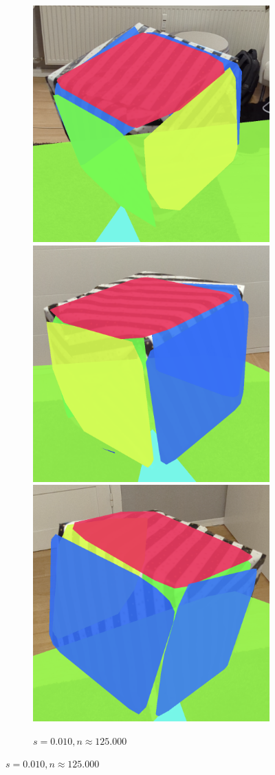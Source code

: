 \begin{figure}[h!tbp]
    \begin{subfigure}[b]{\textwidth}
        \centering
        \includegraphics[width=0.3\linewidth]{images/cube_010_1}
        \includegraphics[width=0.3\linewidth]{images/cube_010_2}
        \includegraphics[width=0.3\linewidth]{images/cube_010_3}
        \caption{$s=0.010, n\approx125.000$}
    \end{subfigure}%

    \vspace{0.5em}


\end{figure}
